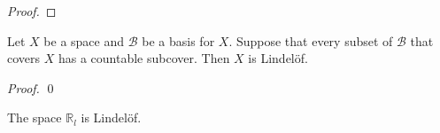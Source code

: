 \begin{proof}
 \pf
\end{proof}

\begin{prop}[CC]
  \label{prop:topology:Lindelof:basis}
  Let $X$ be a space and $\mathcal{B}$ be a basis for $X$. Suppose that every
  subset of $\mathcal{B}$ that covers $X$ has a countable subcover. Then $X$
  is Lindel\"{o}f.
\end{prop}

\begin{proof}
 \pf
 \qed
\end{proof}

\begin{prop}[CC]
  The space $\mathbb{R}_l$ is Lindel\"{o}f.
\end{prop}

